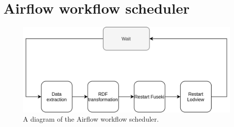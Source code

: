 \chapter{Airflow workflow scheduler}
\label{appendix:airflow}
\begin{figure}[H]
	\centering
	\includegraphics[width=\linewidth]{figures/airflow.png}
	\caption{A diagram of the Airflow workflow scheduler.}
\end{figure}
